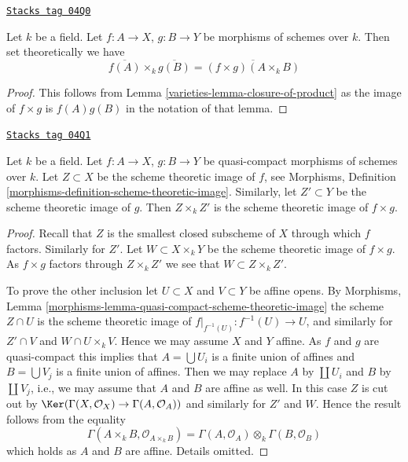\begin{lemma}
\label{varieties-lemma-closure-image-product-map}
\href{https://stacks.math.columbia.edu/tag/04Q0}{\texttt{Stacks tag 04Q0}}

Let $k$ be a field.
Let $f : A \to X$, $g : B \to Y$ be morphisms of schemes over $k$.
Then set theoretically we have
$$
\overline{f(A)} \times_k \overline{g(B)} =
\overline{(f \times g)(A \times_k B)}
$$
\end{lemma}

\begin{proof}

This follows from
Lemma \ref{varieties-lemma-closure-of-product}
as the image of $f \times g$ is $f(A)g(B)$
in the notation of that lemma.
\end{proof}

\begin{lemma}
\label{varieties-lemma-scheme-theoretic-image-product-map}
\href{https://stacks.math.columbia.edu/tag/04Q1}{\texttt{Stacks tag 04Q1}}

Let $k$ be a field.
Let $f : A \to X$, $g : B \to Y$ be quasi-compact morphisms of schemes
over $k$. Let $Z \subset X$ be the scheme theoretic image of $f$, see
Morphisms, Definition \ref{morphisms-definition-scheme-theoretic-image}.
Similarly, let $Z' \subset Y$ be the scheme theoretic image of $g$.
Then $Z \times_k Z'$ is the scheme theoretic image of $f \times g$.
\end{lemma}

\begin{proof}
Recall that $Z$ is the smallest closed subscheme of $X$ through which
$f$ factors. Similarly for $Z'$. Let $W \subset X \times_k Y$ be the
scheme theoretic image of $f \times g$. As $f \times g$ factors through
$Z \times_k Z'$ we see that $W \subset Z \times_k Z'$.

\medskip\noindent
To prove the other inclusion let $U \subset X$ and $V \subset Y$ be
affine opens. By
Morphisms, Lemma \ref{morphisms-lemma-quasi-compact-scheme-theoretic-image}
the scheme $Z \cap U$ is the scheme theoretic image of
$f|_{f^{-1}(U)} : f^{-1}(U) \to U$, and similarly for
$Z' \cap V$ and $W \cap U \times_k V$. Hence we may assume
$X$ and $Y$ affine. As $f$ and $g$ are quasi-compact this implies
that $A = \bigcup U_i$ is a finite union of affines and
$B = \bigcup V_j$ is a finite union of affines.
Then we may replace $A$ by $\coprod U_i$ and $B$ by
$\coprod V_j$, i.e., we may assume that $A$ and $B$ are affine as well.
In this case $Z$ is cut out by
$\Ker(\Gamma(X, \mathcal{O}_X) \to \Gamma(A, \mathcal{O}_A))$
and similarly for $Z'$ and $W$. Hence the result follows from
the equality
$$
\Gamma(A \times_k B, \mathcal{O}_{A \times_k B})
=
\Gamma(A, \mathcal{O}_A) \otimes_k \Gamma(B, \mathcal{O}_B)
$$
which holds as $A$ and $B$ are affine. Details omitted.
\end{proof}

